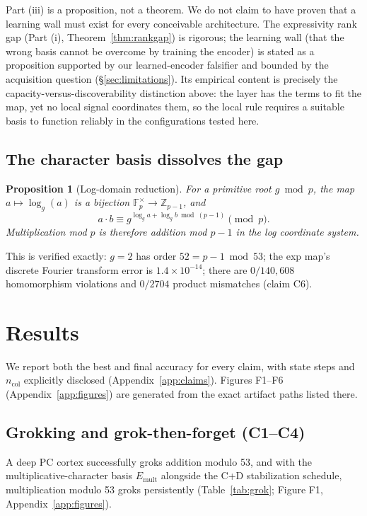 \documentclass[11pt]{article}
\newtheorem{proposition}[theorem]{Proposition}
\begin{document}
Part (iii) is a proposition, not a theorem. We do not claim to have proven that a learning wall must exist for every conceivable architecture. The expressivity rank gap (Part (i), Theorem~\ref{thm:rankgap}) is rigorous; the learning wall (that the wrong basis cannot be overcome by training the encoder) is stated as a proposition supported by our learned-encoder falsifier and bounded by the acquisition question (\S\ref{sec:limitations}). Its empirical content is precisely the capacity-versus-discoverability distinction above: the layer has the terms to fit the map, yet no local signal coordinates them, so the local rule requires a suitable basis to function reliably in the configurations tested here.

\subsection{The character basis dissolves the gap}\label{sec:character}
\begin{proposition}[Log-domain reduction]\label{prop:log}
For a primitive root $g \bmod p$, the map $a \mapsto \log_g(a)$ is a bijection $\mathbb{F}_p^\times \to \mathbb{Z}_{p-1}$, and
\begin{equation}\label{eq:logred}
a \cdot b \equiv g^{\log_g a + \log_g b \bmod (p-1)} \pmod{p}.
\end{equation}
Multiplication mod $p$ is therefore addition mod $p-1$ in the log coordinate system.
\end{proposition}

This is verified exactly: $g=2$ has order $52 = p-1 \bmod 53$; the exp map's discrete Fourier transform error is $1.4\times 10^{-14}$; there are $0/140{,}608$ homomorphism violations and $0/2704$ product mismatches (claim C6).

\section{Results}\label{sec:results}
We report both the best and final accuracy for every claim, with state steps and $n_{\mathrm{col}}$ explicitly disclosed (Appendix~\ref{app:claims}). Figures F1--F6 (Appendix~\ref{app:figures}) are generated from the exact artifact paths listed there.

\subsection{Grokking and grok-then-forget (C1--C4)}\label{sec:grok}
A deep PC cortex successfully groks addition modulo 53, and with the multiplicative-character basis $E_{\mathrm{mult}}$ alongside the C+D stabilization schedule, multiplication modulo 53 groks persistently (Table~\ref{tab:grok}; Figure F1, Appendix~\ref{app:figures}).
\end{document}
